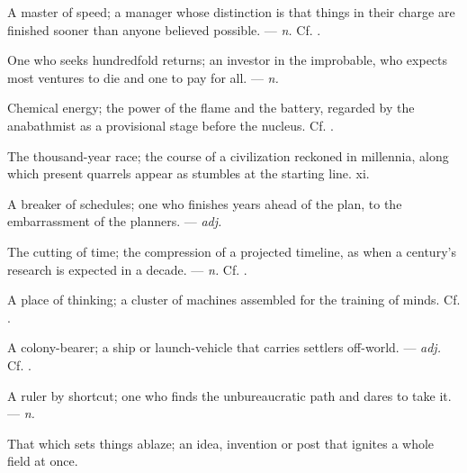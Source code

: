  A master of speed; a manager whose distinction is that things in their charge are finished sooner than anyone believed possible. ---  \textit{n.} Cf. .

 One who seeks hundredfold returns; an investor in the improbable, who expects most ventures to die and one to pay for all. ---  \textit{n.}

 Chemical energy; the power of the flame and the battery, regarded by the anabathmist as a provisional stage before the nucleus. Cf. .

 The thousand-year race; the course of a civilization reckoned in millennia, along which present quarrels appear as stumbles at the starting line.   xi.

 A breaker of schedules; one who finishes years ahead of the plan, to the embarrassment of the planners. ---  \textit{adj.}

 The cutting of time; the compression of a projected timeline, as when a century's research is expected in a decade. ---  \textit{n.} Cf. .

 A place of thinking; a cluster of machines assembled for the training of minds.   Cf. .

 A colony-bearer; a ship or launch-vehicle that carries settlers off-world. ---  \textit{adj.} Cf. .

 A ruler by shortcut; one who finds the unbureaucratic path and dares to take it. ---  \textit{n.}

 That which sets things ablaze; an idea, invention or post that ignites a whole field at once.  

